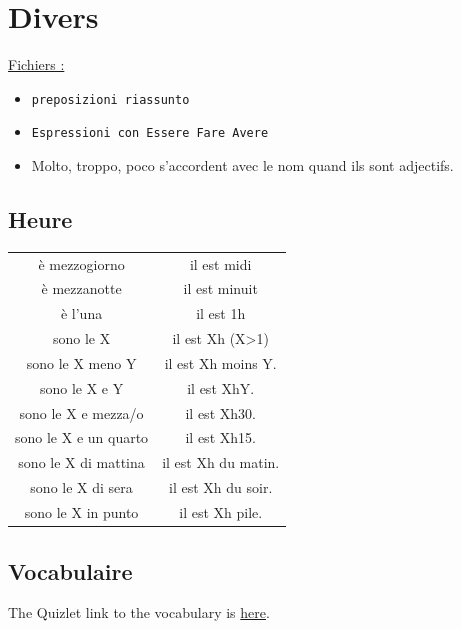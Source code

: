 \documentclass[12pt, openany]{report}
\begin{document}
\chapter{Divers}
\underline{Fichiers :}
\begin{itemize}
    \item \texttt{preposizioni riassunto}
    \item \texttt{Espressioni con Essere Fare Avere}
    \item Molto, troppo, poco s'accordent avec le nom quand ils sont adjectifs. 
\end{itemize}
\section{Heure}
\begin{center}
    \begin{tabular}{c|c}
        è mezzogiorno  & il est midi\\
        è mezzanotte & il est minuit\\
        è l'una & il est 1h\\
        sono le X & il est Xh (X>1)\\
        sono le X meno Y & il est Xh moins Y.\\
        sono le X e Y & il est XhY.\\
        sono le X e mezza/o & il est Xh30.\\
        sono le X e un quarto & il est Xh15.\\
        sono le X di mattina & il est Xh du matin.\\
        sono le X di sera & il est Xh du soir.\\
        sono le X in punto & il est Xh pile.\\
    \end{tabular}
\end{center}
\section{Vocabulaire}
The Quizlet link to the vocabulary is \hyperlink{https://quizlet.com/be/1006471421/lital1100-q2-flash-cards/}{here}.
\end{document}
